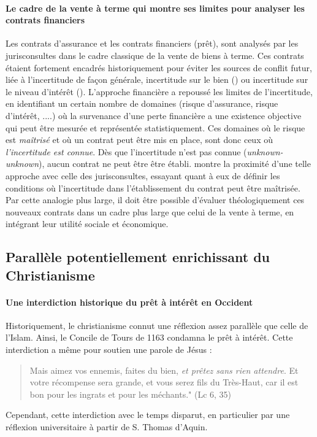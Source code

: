 \paragraph{Le cadre de la vente à terme qui montre ses limites pour analyser les contrats financiers} Les contrats d'assurance et les contrats financiers (prêt), sont analysés par les jurisconsultes dans le cadre classique de la vente de biens à terme. Ces contrats étaient fortement encadrés historiquement pour éviter les sources de conflit futur, liée à l'incertitude de façon générale, incertitude sur le bien (\gharar) ou incertitude sur le niveau d'intérêt (\riba). L'approche financière a repoussé les limites de l'incertitude, en identifiant un certain nombre de domaines (risque d'assurance, risque d'intérêt, ....) où la survenance d'une perte financière a une existence objective qui peut être mesurée et représentée statistiquement. Ces domaines où le risque est \textit{maîtrisé} et où un contrat peut être mis en place, sont donc ceux où \textit{l'incertitude est connue}. Dès que l'incertitude n'est pas connue (\textit{unknown-unknown}), aucun contrat ne peut être être établi. \cite{Rittenberg:Gharar} montre la proximité d'une telle approche avec celle des jurisconsultes, essayant quant à eux de définir les conditions où l'incertitude dans l'établissement du contrat peut être maîtrisée. Par cette analogie plus large, il doit être possible d'évaluer théologiquement ces nouveaux contrats dans un cadre plus large que celui de la vente à terme, en intégrant leur utilité sociale et économique.


\subsection{Parallèle potentiellement enrichissant du Christianisme}
\paragraph{Une interdiction historique du prêt à intérêt en Occident} Historiquement, le christianisme connut une réflexion assez parallèle que celle de l'Islam. Ainsi, le Concile de Tours de 1163 condamna le prêt à intérêt. Cette interdiction a même pour soutien une parole de Jésus : 
\begin{quote}
    Mais aimez vos ennemis, faites du bien, \textit{et prêtez sans rien attendre}. Et votre récompense sera grande, et vous serez fils du Très-Haut, car il est bon pour les ingrats et pour les méchants." (Lc 6, 35)
\end{quote}
Cependant, cette interdiction avec le temps disparut, en particulier par une réflexion universitaire à partir de S. Thomas d'Aquin.
 
